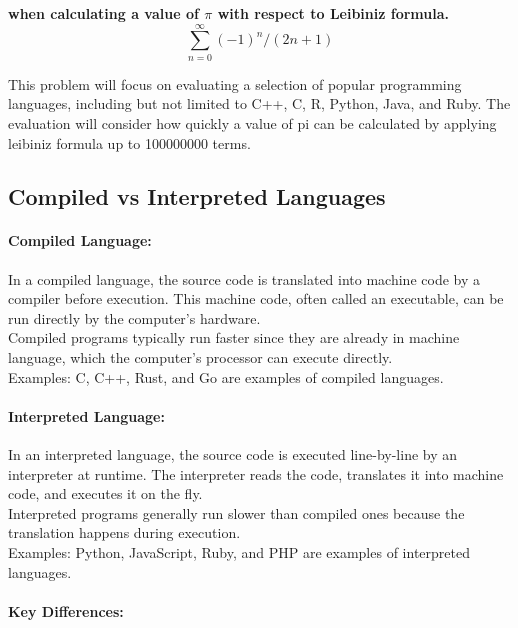\documentclass[12pt,halfline,a4paper,]{ouparticle}
\begin{document}
\textbf{when calculating a value of \(\pi\) with respect to Leibiniz
formula. \[\sum_{n=0}^{\infty} (-1)^n/(2n+1)\]}

This problem will focus on evaluating a selection of popular programming
languages, including but not limited to C++, C, R, Python, Java, and
Ruby. The evaluation will consider how quickly a value of pi can be
calculated by applying leibiniz formula up to 100000000 terms.\\

\subsection{Compiled vs Interpreted
Languages}\label{compiled-vs-interpreted-languages}

\paragraph{Compiled Language:}\label{compiled-language}

\hfill\break
In a compiled language, the source code is translated into machine code
by a compiler before execution. This machine code, often called an
executable, can be run directly by the computer's hardware.\\
Compiled programs typically run faster since they are already in machine
language, which the computer's processor can execute directly.\\
Examples: C, C++, Rust, and Go are examples of compiled languages.

\paragraph{Interpreted Language:}\label{interpreted-language}

\hfill\break
In an interpreted language, the source code is executed line-by-line by
an interpreter at runtime. The interpreter reads the code, translates it
into machine code, and executes it on the fly.\\
Interpreted programs generally run slower than compiled ones because the
translation happens during execution.\\
Examples: Python, JavaScript, Ruby, and PHP are examples of interpreted
languages.

\paragraph{Key Differences:}\label{key-differences}
\end{document}
